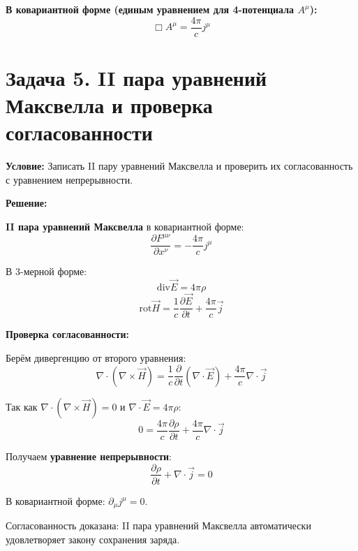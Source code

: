 \documentclass[12pt,a4paper]{article}
\begin{document}
\textbf{В ковариантной форме (единым уравнением для 4-потенциала $A^\mu$):}
\[
\boxed{\Box A^\mu = \frac{4\pi}{c} j^\mu}
\]
\section*{Задача 5. II пара уравнений Максвелла и проверка согласованности}

\textbf{Условие:} Записать II пару уравнений Максвелла и проверить их согласованность с уравнением непрерывности.

\textbf{Решение:}

\textbf{II пара уравнений Максвелла} в ковариантной форме:
\begin{equation}
\boxed{\frac{\partial F^{\mu\nu}}{\partial x^\nu} = -\frac{4\pi}{c} j^\mu}
\end{equation}

В 3-мерной форме:
\begin{equation}
\boxed{\text{div} \vec{E} = 4\pi \rho}
\end{equation}
\begin{equation}
\boxed{\text{rot} \vec{H} = \frac{1}{c}\frac{\partial \vec{E}}{\partial t} + \frac{4\pi}{c} \vec{j}}
\end{equation}

\textbf{Проверка согласованности:}

Берём дивергенцию от второго уравнения:
\begin{equation}
\nabla \cdot (\nabla \times \vec{H}) = \frac{1}{c}\frac{\partial}{\partial t}(\nabla \cdot \vec{E}) + \frac{4\pi}{c} \nabla \cdot \vec{j}
\end{equation}

Так как $\nabla \cdot (\nabla \times \vec{H}) = 0$ и $\nabla \cdot \vec{E} = 4\pi \rho$:
\begin{equation}
0 = \frac{4\pi}{c}\frac{\partial \rho}{\partial t} + \frac{4\pi}{c} \nabla \cdot \vec{j}
\end{equation}

Получаем \textbf{уравнение непрерывности}:
\begin{equation}
\boxed{\frac{\partial \rho}{\partial t} + \nabla \cdot \vec{j} = 0}
\end{equation}

В ковариантной форме: $\partial_\mu j^\mu = 0$.

Согласованность доказана: II пара уравнений Максвелла автоматически удовлетворяет закону сохранения заряда.
\end{document}
